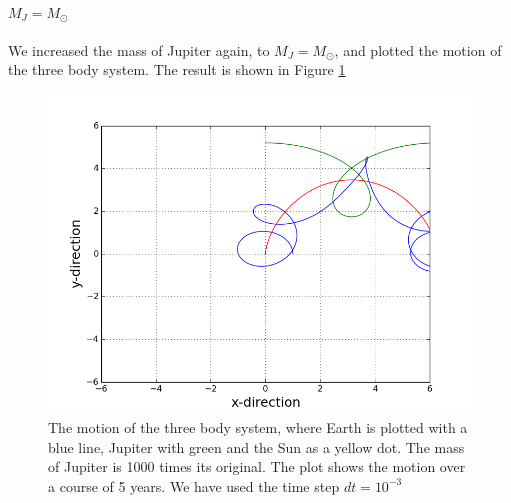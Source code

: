 \documentclass[norsk,a4paper,12pt]{article}
\begin{document}
{\paragraph{\textbf{$M_J = M_{\odot}$}}

We increased the mass of Jupiter again, to $M_J = M_{\odot}$, and plotted the motion of the three body system. The result is shown in Figure \ref{fig:Jupiter_m=1_Earth}

\begin{figure} [H]
    \centering
    \includegraphics[scale=0.6]{oppg_3e_threebody_Jupiter_m=1_Earth}
    \caption{The motion of the three body system, where Earth is plotted with a blue line, Jupiter with green and the Sun as a yellow dot. The mass of Jupiter is 1000 times its original. The plot shows the motion over a course of 5 years. We have used the time step $dt = 10^{-3}$}
    \label{fig:Jupiter_m=1_Earth}
\end{figure}

}
\end{document}
